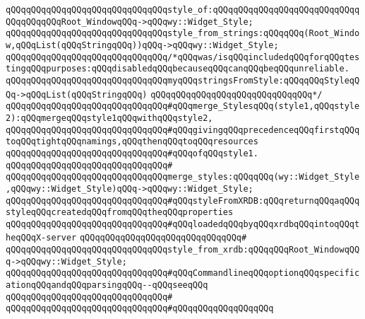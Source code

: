 \newline
\verb|qQQqqQQqqQQqqQQqqQQqqQQqqQQqqQQqstyle_of:qQQqqQQqqQQqqQQqqQQqqQQqqQQqqQQqqQQqqQQqRoot_WindowqQQq->qQQqwy::Widget_Style;|\newline
\verb|qQQqqQQqqQQqqQQqqQQqqQQqqQQqqQQqstyle_from_strings:qQQqqQQq(Root_Window,qQQqList(qQQqStringqQQq))qQQq->qQQqwy::Widget_Style;|\newline
\newline
\verb|qQQqqQQqqQQqqQQqqQQqqQQqqQQqqQQq/*qQQqwas/isqQQqincludedqQQqforqQQqtestingqQQqpurposes:qQQqdisabledqQQqbecauseqQQqcanqQQqbeqQQqunreliable.|\newline
\verb|qQQqqQQqqQQqqQQqqQQqqQQqqQQqqQQqmyqQQqstringsFromStyle:qQQqqQQqStyleqQQq->qQQqList(qQQqStringqQQq)|\newline
\verb|qQQqqQQqqQQqqQQqqQQqqQQqqQQqqQQq*/|\newline
\newline
\verb|qQQqqQQqqQQqqQQqqQQqqQQqqQQqqQQq#qQQqmerge_StylesqQQq(style1,qQQqstyle2):qQQqmergeqQQqstyle1qQQqwithqQQqstyle2,|\newline
\verb|qQQqqQQqqQQqqQQqqQQqqQQqqQQqqQQq#qQQqgivingqQQqprecedenceqQQqfirstqQQqtoqQQqtightqQQqnamings,qQQqthenqQQqtoqQQqresources|\newline
\verb|qQQqqQQqqQQqqQQqqQQqqQQqqQQqqQQq#qQQqofqQQqstyle1.|\newline
\verb|qQQqqQQqqQQqqQQqqQQqqQQqqQQqqQQq#|\newline
\verb|qQQqqQQqqQQqqQQqqQQqqQQqqQQqqQQqmerge_styles:qQQqqQQq(wy::Widget_Style,qQQqwy::Widget_Style)qQQq->qQQqwy::Widget_Style;|\newline
\newline
\verb|qQQqqQQqqQQqqQQqqQQqqQQqqQQqqQQq#qQQqstyleFromXRDB:qQQqreturnqQQqaqQQqstyleqQQqcreatedqQQqfromqQQqtheqQQqproperties|\newline
\verb|qQQqqQQqqQQqqQQqqQQqqQQqqQQqqQQq#qQQqloadedqQQqbyqQQqxrdbqQQqintoqQQqtheqQQqX-server|\newline
\verb|qQQqqQQqqQQqqQQqqQQqqQQqqQQqqQQq#|\newline
\verb|qQQqqQQqqQQqqQQqqQQqqQQqqQQqqQQqstyle_from_xrdb:qQQqqQQqRoot_WindowqQQq->qQQqwy::Widget_Style;|\newline
\newline
\verb|qQQqqQQqqQQqqQQqqQQqqQQqqQQqqQQq#qQQqCommandlineqQQqoptionqQQqspecificationqQQqandqQQqparsingqQQq--qQQqseeqQQq|\newline
\verb|qQQqqQQqqQQqqQQqqQQqqQQqqQQqqQQq#|\newline
\verb|qQQqqQQqqQQqqQQqqQQqqQQqqQQqqQQq#qQQqqQQqqQQqqQQqqQQq|\newline
